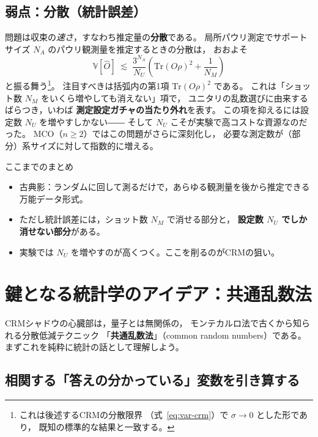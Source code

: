 \documentclass[11pt]{ltjsarticle}
\newcommand{\Tr}{\mathrm{Tr}}
\newcommand{\Var}{\mathbb{V}}
\newcommand{\NU}{N_U}
\newcommand{\NM}{N_M}
\begin{document}
\subsection{弱点：分散（統計誤差）}

問題は収束の\emph{速さ}，すなわち推定量の\textbf{分散}である。
局所パウリ測定でサポートサイズ $N_A$ のパウリ観測量を推定するときの分散は，
おおよそ
\begin{equation}
  \Var[\hat O] \;\lesssim\; \frac{3^{N_A}}{\NU}
  \left( \Tr(O\rho)^2 + \frac{1}{\NM} \right)
  \label{eq:var-standard}
\end{equation}
と振る舞う\footnote{これは後述するCRMの分散限界
（式~\eqref{eq:var-crm}）で $\sigma \to 0$ とした形であり，
既知の標準的な結果と一致する。}。
注目すべきは括弧内の第1項 $\Tr(O\rho)^2$ である。
これは「ショット数 $\NM$ をいくら増やしても消えない」項で，
ユニタリの乱数選びに由来するばらつき，いわば
\textbf{測定設定ガチャの当たり外れ}を表す。
この項を抑えるには設定数 $\NU$ を増やすしかない――
そして $\NU$ こそが実験で高コストな資源なのだった。
MCO（$n \geq 2$）ではこの問題がさらに深刻化し，
必要な測定数が（部分）系サイズに対して指数的に増える。

\begin{pointbox}{ここまでのまとめ}
\begin{itemize}
  \item 古典影：ランダムに回して測るだけで，あらゆる観測量を後から推定できる万能データ形式。
  \item ただし統計誤差には，ショット数 $\NM$ で消せる部分と，
        \textbf{設定数 $\NU$ でしか消せない部分}がある。
  \item 実験では $\NU$ を増やすのが高くつく。ここを削るのがCRMの狙い。
\end{itemize}
\end{pointbox}

\section{鍵となる統計学のアイデア：共通乱数法}

CRMシャドウの心臓部は，量子とは無関係の，
モンテカルロ法で古くから知られる分散低減テクニック
「\textbf{共通乱数法}」（common random numbers）である。
まずこれを純粋に統計の話として理解しよう。

\subsection{相関する「答えの分かっている」変数を引き算する}
\end{document}
